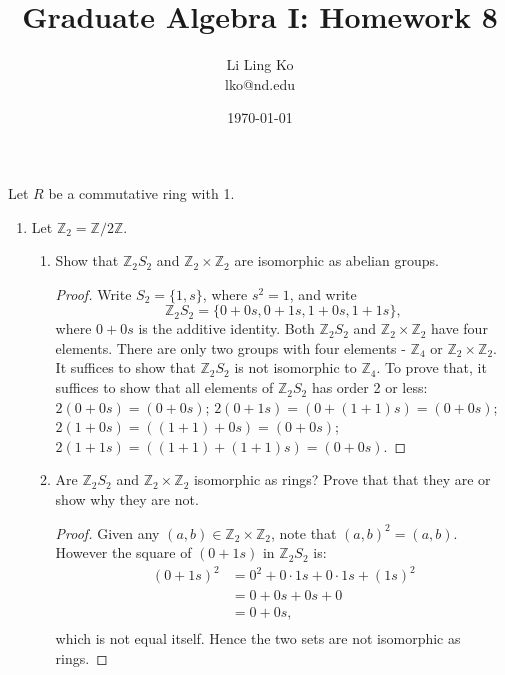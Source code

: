 \documentclass{article}
\begin{document}
\title{Graduate Algebra I: Homework 8}
\author{Li Ling Ko\\ lko@nd.edu}
\date{\today}
\maketitle

Let $R$ be a commutative ring with 1.

\begin{enumerate}[label={\bf Q\arabic*:}]
  \item Let $\mathbb{Z}_2=\mathbb{Z}/2\mathbb{Z}$.
    \begin{enumerate}
      \item Show that $\mathbb{Z}_2S_2$ and
        $\mathbb{Z}_2\times\mathbb{Z}_2$ are isomorphic as abelian groups.

        \begin{proof}
          Write $S_2=\{1,s\}$, where $s^2=1$, and write
          \[\mathbb{Z}_2S_2=\{0+0s,0+1s,1+0s,1+1s\},\] where $0+0s$ is the
          additive identity.  Both $\mathbb{Z}_2S_2$ and
          $\mathbb{Z}_2\times\mathbb{Z}_2$ have four elements. There are
          only two groups with four elements - $\mathbb{Z}_4$ or
          $\mathbb{Z}_2\times\mathbb{Z}_2$. It suffices to show that
          $\mathbb{Z}_2S_2$ is not isomorphic to $\mathbb{Z}_4$. To prove
          that, it suffices to show that all elements of $\mathbb{Z}_2S_2$
          has order 2 or less: $2(0+0s)=(0+0s)$;
          $2(0+1s)=(0+(1+1)s)=(0+0s)$; $2(1+0s)=((1+1)+0s)=(0+0s)$;
          $2(1+1s)=((1+1)+(1+1)s)=(0+0s)$.
        \end{proof}

      \item Are $\mathbb{Z}_2S_2$ and $\mathbb{Z}_2\times\mathbb{Z}_2$
        isomorphic as rings? Prove that that they are or show why they are
        not.

        \begin{proof}
          Given any $(a,b)\in\mathbb{Z}_2\times\mathbb{Z}_2$, note that
          $(a,b)^2=(a,b)$. However the square of $(0+1s)$ in
          $\mathbb{Z}_2S_2$ is:
          \begin{align*}
            (0+1s)^2  &= 0^2+0\cdot1s+0\cdot1s+(1s)^2 \\
              &= 0+0s+0s+0 \\
              &= 0+0s, \\
          \end{align*}
          which is not equal itself. Hence the two sets are not isomorphic
          as rings.
        \end{proof}
    \end{enumerate}


\end{enumerate}
\end{document}
